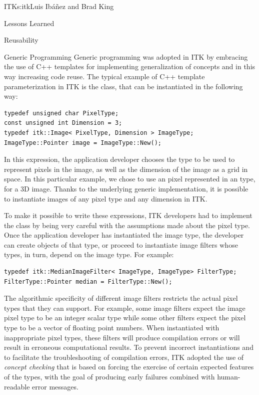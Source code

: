 \begin{aosachapter}{ITK}{s:itk}{Luis Ib\'{a}\~{n}ez and Brad King}
\begin{aosasect1}{Lessons Learned}
\begin{aosasect2}{Reusability}
\begin{aosasect3}{Generic Programming}
Generic programming was adopted in ITK by embracing the use of C++ templates
for implementing generalization of concepts and in this way increasing code
reuse. The typical example of C++ template parameterization in ITK is the
 class, that can be instantiated in the following way:

\begin{verbatim}
typedef unsigned char PixelType;
const unsigned int Dimension = 3;
typedef itk::Image< PixelType, Dimension > ImageType;
ImageType::Pointer image = ImageType::New();
\end{verbatim}

In this expression, the application developer chooses the type to be used to
represent pixels in the image, as well as the dimension of the image as a grid
in space. In this particular example, we chose to use an  pixel
represented in an  type, for a 3D image. Thanks to the
underlying generic implementation, it is possible to instantiate images
of any pixel type and any dimension in ITK.

To make it possible to write these expressions, ITK developers had to implement
the  class by being very careful with the assumptions made about
the pixel type.  Once the application developer has instantiated the image
type, the developer can create objects of that type, or proceed to instantiate
image filters whose types, in turn, depend on the image type.  For example:

\begin{verbatim}
typedef itk::MedianImageFilter< ImageType, ImageType> FilterType;
FilterType::Pointer median = FilterType::New();
\end{verbatim}

The algorithmic specificity of different image filters restricts the actual
pixel types that they can support. For example, some image filters expect the
image pixel type to be an integer scalar type while some other filters expect the pixel
type to be a vector of floating point numbers. When instantiated with inappropriate pixel
types, these filters will produce compilation errors or will result in
erroneous computational results. To prevent incorrect instantiations and to
facilitate the troubleshooting of compilation errors, ITK adopted the use of
\emph{concept checking} that is based on forcing the exercise of certain
expected features of the types, with the goal of producing early failures
combined with human-readable error messages.


\end{aosasect3}
\end{aosasect2}
\end{aosasect1}
\end{aosachapter}
